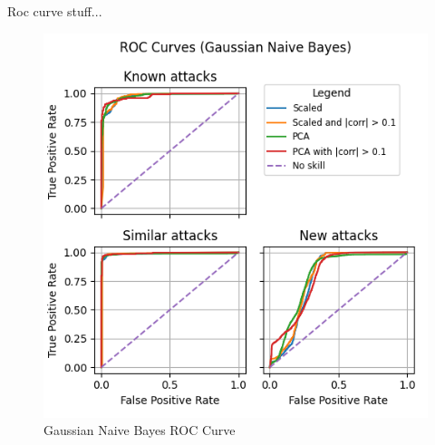 Roc curve stuff...
\begin{figure}
    \centering
    \includegraphics[width=\linewidth]{figures/Gaussian Naive Bayes_roc_all_small.png}
    \caption{Gaussian Naive Bayes ROC Curve}
    \label{fig:gaus_roc}
\end{figure}




